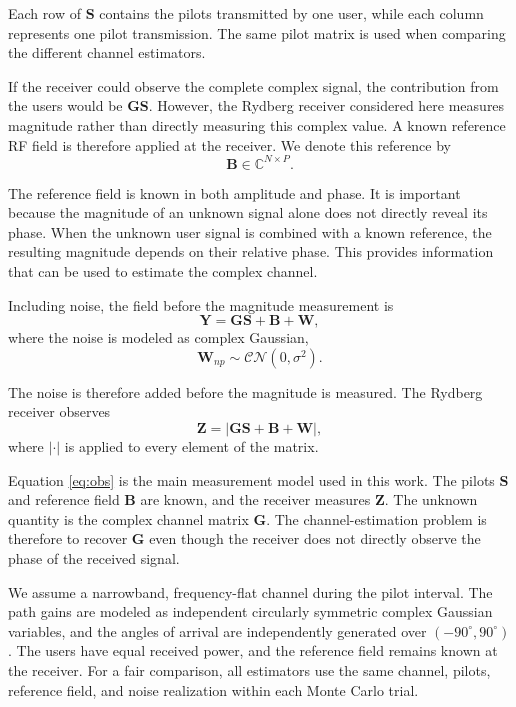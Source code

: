 \documentclass[journal]{IEEEtran}
\newcommand{\bG}{\mathbf{G}}
\newcommand{\bS}{\mathbf{S}}
\newcommand{\bB}{\mathbf{B}}
\newcommand{\bW}{\mathbf{W}}
\newcommand{\bY}{\mathbf{Y}}
\newcommand{\bZ}{\mathbf{Z}}
\newcommand{\CN}{\mathcal{CN}}
\begin{document}
Each row of $\bS$ contains the pilots transmitted by one user, while each
column represents one pilot transmission. The same pilot matrix is used when
comparing the different channel estimators.

If the receiver could observe the complete complex signal, the contribution
from the users would be $\bG\bS$. However, the Rydberg receiver considered here
measures magnitude rather than directly measuring this complex value. A known
reference RF field is therefore applied at the receiver. We denote this
reference by
\begin{equation}
\bB\in\mathbb{C}^{N\times P}.
\end{equation}

The reference field is known in both amplitude and phase. It is important
because the magnitude of an unknown signal alone does not directly reveal its
phase. When the unknown user signal is combined with a known reference, the
resulting magnitude depends on their relative phase. This provides information
that can be used to estimate the complex channel.

Including noise, the field before the magnitude measurement is
\begin{equation}
\bY=\bG\bS+\bB+\bW,
\end{equation}
where the noise is modeled as complex Gaussian,
\begin{equation}
\bW_{np}\sim\CN(0,\sigma^2).
\end{equation}

The noise is therefore added before the magnitude is measured. The Rydberg
receiver observes
\begin{equation}
\bZ=\left|\bG\bS+\bB+\bW\right|,
\label{eq:obs}
\end{equation}
where $|\cdot|$ is applied to every element of the matrix.

Equation \eqref{eq:obs} is the main measurement model used in this work. The
pilots $\bS$ and reference field $\bB$ are known, and the receiver measures
$\bZ$. The unknown quantity is the complex channel matrix $\bG$. The
channel-estimation problem is therefore to recover $\bG$ even though the
receiver does not directly observe the phase of the received signal.

We assume a narrowband, frequency-flat channel during the pilot interval. The
path gains are modeled as independent circularly symmetric complex Gaussian
variables, and the angles of arrival are independently generated over
$(-90^\circ,90^\circ)$. The users have equal received power, and the reference
field remains known at the receiver. For a fair comparison, all estimators use
the same channel, pilots, reference field, and noise realization within each
Monte Carlo trial.
\end{document}
